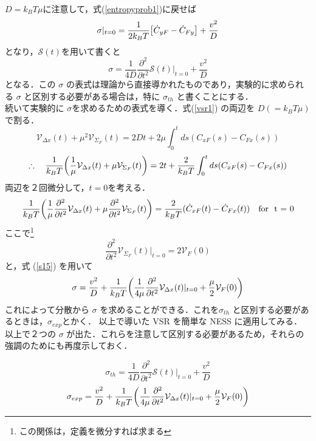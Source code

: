 \documentclass{jsarticle}
\numberwithin{equation}{section}
\theoremstyle{definition}
\begin{document}
$D=k_B T \mu$に注意して，式(\ref{entropyprob1})に戻せば
\begin{equation}
  \label{s15}
  \sigma|_{t = 0} = \frac{1}{2k_B T} \qty[ \dot{C}_{yF} - \dot{C}_{Fy} ] + \frac{v^2}{D}
\end{equation}
となり，$\mathcal{S} (t) $を用いて書くと
\begin{equation}
  \label{vsr3}
  \sigma = \frac{1}{4D} \frac{\partial^2}{\partial t^2} \mathcal{S} (t) |_{t = 0}  + \frac{v^2}{D}
\end{equation}
となる．この $\sigma$ の表式は理論から直接導かれたものであり，実験的に求められる $\sigma$ と区別する必要がある場合は，特に $\sigma_{th}$ と書くことにする．\\
\quad 続いて実験的に $\sigma$を求めるための表式を導く．式(\ref{vsr1}) の両辺を $D( =k_B T \mu )$ で割る．
\begin{equation}
  \mathcal{V} _{\Delta x} (t) + \mu^2 \mathcal{V} _{\Sigma_F} (t) = 2Dt + 2\mu \int_0^t ds ( C_{xF} (s) - C_{Fx} (s) )
\end{equation}
\begin{equation}
  \therefore \quad \frac{1}{k_B T} \qty( \frac{1}{\mu} \mathcal{V} _{\Delta x} (t) + \mu \mathcal{V} _{\Sigma_F} (t)) = 2t + \frac{2}{k_B T} \int_0^t ds ( C_{xF} (s) - C_{Fx} (s) )
\end{equation}
両辺を２回微分して，$t=0$を考える．
\begin{equation}
  \frac{1}{k_B T} \qty( \frac{1}{\mu} \frac{\partial^2}{\partial t^2} \mathcal{V} _{\Delta x} (t) + \mu \frac{\partial^2}{\partial t^2} \mathcal{V} _{\Sigma_F} (t)) = \frac{2}{k_B T} ( \dot{C}_{xF} (t) - \dot{C}_{Fx} (t) ) \quad \text{for \ t = 0}
\end{equation}
ここで\footnote{この関係は，定義を微分すれば求まる}
\begin{equation}
  \frac{\partial^2}{\partial t^2} \mathcal{V} _{\Sigma_F} (t)|_{t = 0} = 2 \mathcal{V}_F (0)
\end{equation}
と，式 (\ref{s15}) を用いて 
\begin{equation}
  \sigma = \frac{v^2}{D} + \frac{1}{k_B T} \qty( \frac{1}{4 \mu } \frac{\partial^2}{\partial t^2} \mathcal{V} _{\Delta x} (t)|_{t = 0} + \frac{\mu }{2} \mathcal{V}_F (0) )
\end{equation}
これによって分散から $\sigma$ を求めることができる．これを$\sigma_{th}$ と区別する必要があるときは，$\sigma_{exp}$とかく．
以上で導いた VSR を簡単な NESS に適用してみる．\\
\quad 以上で２つの $\sigma$ が出た．これらを注意して区別する必要があるため，それらの強調のためにも再度示しておく．
\begin{tcolorbox}
  \begin{equation}
    \label{sigma_th}
    \sigma_{th} = \frac{1}{4D} \frac{\partial^2}{\partial t^2} \mathcal{S} (t) |_{t = 0}  + \frac{v^2}{D}
  \end{equation}
  \begin{equation}
    \label{sigma_exp}
    \sigma_{exp} = \frac{v^2}{D} + \frac{1}{k_B T} \qty( \frac{1}{4 \mu } \frac{\partial^2}{\partial t^2} \mathcal{V} _{\Delta x} (t)|_{t = 0} + \frac{\mu }{2} \mathcal{V}_F (0) )
  \end{equation}
\end{tcolorbox}
\end{document}
